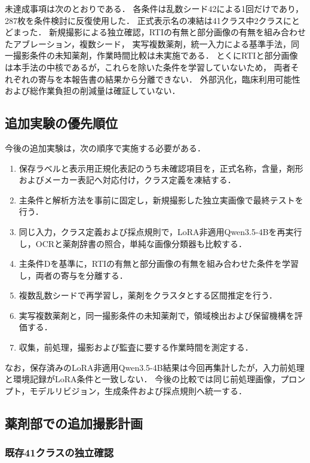 \documentclass[uplatex,dvipdfmx]{jsarticle}
\begin{document}
未達成事項は次のとおりである．
各条件は乱数シード42による1回だけであり，287枚を条件検討に反復使用した．
正式表示名の凍結は41クラス中2クラスにとどまった．
新規撮影による独立確認，RTIの有無と部分画像の有無を組み合わせたアブレーション，複数シード，
実写複数薬剤，統一入力による基準手法，同一撮影条件の未知薬剤，作業時間比較は未実施である．
とくにRTIと部分画像は本手法の中核であるが，これらを除いた条件を学習していないため，
両者それぞれの寄与を本報告書の結果から分離できない．
外部汎化，臨床利用可能性および総作業負担の削減量は確証していない．

\subsection{追加実験の優先順位}

今後の追加実験は，次の順序で実施する必要がある．
\begin{enumerate}
  \item 保存ラベルと表示用正規化表記のうち未確認項目を，正式名称，含量，剤形およびメーカー表記へ対応付け，クラス定義を凍結する．
  \item 主条件と解析方法を事前に固定し，新規撮影した独立実画像で最終テストを行う．
  \item 同じ入力，クラス定義および採点規則で，LoRA非適用Qwen3.5-4Bを再実行し，OCRと薬剤辞書の照合，単純な画像分類器も比較する．
  \item 主条件Dを基準に，RTIの有無と部分画像の有無を組み合わせた条件を学習し，両者の寄与を分離する．
  \item 複数乱数シードで再学習し，薬剤をクラスタとする区間推定を行う．
  \item 実写複数薬剤と，同一撮影条件の未知薬剤で，領域検出および保留機構を評価する．
  \item 収集，前処理，撮影および監査に要する作業時間を測定する．
\end{enumerate}
なお，保存済みのLoRA非適用Qwen3.5-4B結果は今回再集計したが，入力前処理と環境記録がLoRA条件と一致しない．
今後の比較では同じ前処理画像，プロンプト，モデルリビジョン，生成条件および採点規則へ統一する．

\subsection{薬剤部での追加撮影計画}

\subsubsection{既存41クラスの独立確認}
\end{document}
